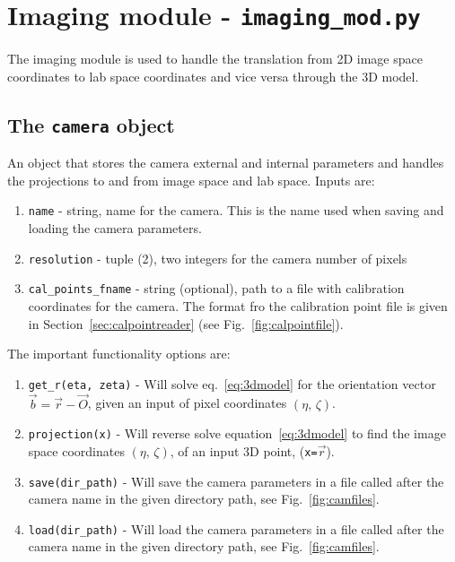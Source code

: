 \documentclass[10pt,a4paper]{article}
\begin{document}
\clearpage


\section{Imaging module - \texttt{imaging\_mod.py}}\label{sec:image_mod}


The imaging module is used to handle the translation from 2D image space coordinates to lab space coordinates and vice versa through the 3D model. 



\subsection{The \texttt{camera} object}\label{sec:camera}

An object that stores the camera external and internal parameters and handles the projections to and from image space and lab space. Inputs are:

\begin{enumerate}
	\item \texttt{name} - string, name for the camera. This is the name used when saving and loading the camera parameters.
	\item \texttt{resolution} - tuple (2), two integers for the camera number of pixels
	\item \texttt{cal\_points\_fname} - string (optional), path to a file with calibration coordinates for the camera. The format fro the calibration point file is given in Section~\ref{sec:calpointreader} (see Fig.~\ref{fig:calpointfile}).
\end{enumerate}


The important functionality options are:


\begin{enumerate}
	\item \texttt{get\_r(eta, zeta)} - Will solve eq.~\ref{eq:3dmodel} for the orientation vector $\vec{b} = \vec{r} - \vec{O}$, given an input of pixel coordinates $(\eta, \, \zeta)$.
	
	\item \texttt{projection(x)} - Will reverse solve equation~\eqref{eq:3dmodel} to find the image space coordinates $(\eta, \, \zeta)$, of an input 3D point, (\texttt{x=}$\vec{r}$).
	
	\item \texttt{save(dir\_path)} - Will save the camera parameters in a file called after the camera name in the given directory path, see Fig.~\ref{fig:camfiles}.
	
	\item \texttt{load(dir\_path)} - Will load the camera parameters in a file called after the camera name in the given directory path, see Fig.~\ref{fig:camfiles}.
\end{enumerate}
\end{document}
